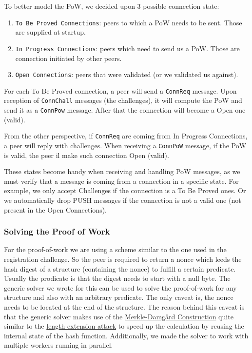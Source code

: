 \documentclass[a4paper,english,10pt,NET]{tumarticle}
\begin{document}
To better model the PoW, we decided upon 3 possible connection state:

\begin{enumerate}
	\item \texttt{To Be Proved Connections}: peers to which a PoW needs to be sent. Those are supplied at startup.
	\item \texttt{In Progress Connections}: peers which need to send us a PoW. Those are connection initiated by other peers.
	\item \texttt{Open Connections}: peers that were validated (or we validated us against).
\end{enumerate}

For each To Be Proved connection, a peer will send a \texttt{ConnReq} message. Upon reception of \texttt{ConnChall} messages (the challenges), it will compute the PoW and send it as a \texttt{ConnPow} message. After that the connection will become a Open one (valid).

From the other perspective, if \texttt{ConnReq} are coming from In Progress Connections, a peer will reply with challenges. When receiving a \texttt{ConnPoW} message, if the PoW is valid, the peer il make such connection Open (valid). 

These states become handy when receiving and handling PoW messages, as we must verify that a message is coming from a connection in a specific state. For example, we only accept Challenges if the connection is a To Be Proved ones. Or we automatically drop PUSH messages if the connection is not a valid one (not present in the Open Connections).

\subsubsection{Solving the Proof of Work}
For the proof-of-work we are using a scheme similar to the one used in the registration challenge.
So the peer is required to return a nonce which leeds the hash digest of a structure (containing the nonce) to fulfill a certain predicate.
Usually the prodicate is that the digest needs to start with a null byte.
The generic solver we wrote for this can be used to solve the proof-of-work for any structure and also with an arbitrary predicate.
The only caveat is, the nonce needs to be located at the end of the structure.
The reason behind this caveat is that the generic solver makes use of the \href{https://en.wikipedia.org/wiki/Merkle\%E2\%80\%93Damg\%C3\%A5rd\_construction}{Merkle-Damg\aa rd Construction} quite similar to the \href{https://en.wikipedia.org/wiki/Length\_extension\_attack}{length extension attack} to speed up the calculation by reusing the internal state of the hash function.
Additionally, we made the solver to work with multiple workers running in parallel.
\end{document}
